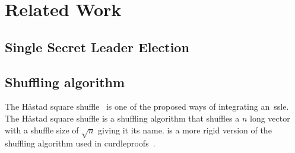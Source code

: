 \section{Related Work}\label{sec:related-work}




\subsection{Single Secret Leader Election}\label{sec:related-work-SSLE}




\subsection{Shuffling algorithm}\label{sec:related-work-Shuffling-algorithm}

The Håstad square shuffle~\cite{haastad2006square} is one of the proposed ways of integrating an~\gls{ssle}.
The Håstad square shuffle is a shuffling algorithm that shuffles a $n$ long vector with a shuffle size of $\sqrt {n}$ giving it its name.
is a more rigid version of the shuffling algorithm used in curdleproofs~\cite{cryptoeprint:2022/560}.




%
%


